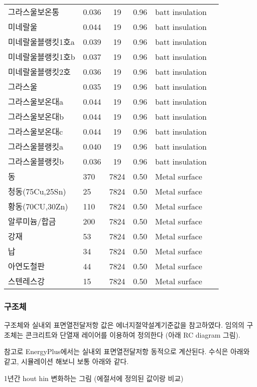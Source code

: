\begin{longtable}{llcclc}
  그라스울보온통 &   0.036 &   19 & 0.96 & batt insulation & \cite{ashrae_f18} \\
  미네랄울 &   0.044 &   19 & 0.96 & batt insulation & \cite{ashrae_f18} \\
  미네랄울블랭킷1호a &   0.039 &   19 & 0.96 & batt insulation & \cite{ashrae_f18} \\
  미네랄울블랭킷1호b &   0.037 &   19 & 0.96 & batt insulation & \cite{ashrae_f18} \\
  미네랄울블랭킷2호 &   0.036 &   19 & 0.96 & batt insulation & \cite{ashrae_f18} \\
  그라스울 &   0.035 &   19 & 0.96 & batt insulation & \cite{ashrae_f18} \\
  그라스울보온대a &   0.044 &   19 & 0.96 & batt insulation & \cite{ashrae_f18} \\
  그라스울보온대b &   0.044 &   19 & 0.96 & batt insulation & \cite{ashrae_f18} \\
  그라스울보온대c &   0.044 &   19 & 0.96 & batt insulation & \cite{ashrae_f18} \\
  그라스울블랭킷a &   0.040 &   19 & 0.96 & batt insulation & \cite{ashrae_f18} \\
  그라스울블랭킷b &   0.036 &   19 & 0.96 & batt insulation & \cite{ashrae_f18} \\
  동 & 370 & 7824 & 0.50 & Metal surface & \cite{ashrae_f18} \\
  청동(75Cu,25Sn) &  25 & 7824 & 0.50 & Metal surface & \cite{ashrae_f18} \\
  황동(70CU,30Zn) & 110 & 7824 & 0.50 & Metal surface & \cite{ashrae_f18} \\
  알루미늄/합금 & 200 & 7824 & 0.50 & Metal surface & \cite{ashrae_f18} \\
  강재 &  53 & 7824 & 0.50 & Metal surface & \cite{ashrae_f18} \\
  납 &  34 & 7824 & 0.50 & Metal surface & \cite{ashrae_f18} \\
  아연도철판 &  44 & 7824 & 0.50 & Metal surface & \cite{ashrae_f18} \\
  스텐레스강 &  15 & 7824 & 0.50 & Metal surface & \cite{ashrae_f18} \\
  \bottomrule
\end{longtable}

\subsubsection{구조체}
구조체와 실내외 표면열전달저항 값은 에너지절약설계기준값을 참고하였다. 임의의 구조체는 콘크리트와 단열재 레이어를 이용하여 정의한다 (아래 RC diagram 그림).\par
참고로 EnergyPlus에서는 실내외 표면열전달저항 동적으로 계산된다. 수식은 아래와 같고, 시뮬레이션 해보니 보통 아래와 같다. 
\begin{tcolorbox}[colback=gray!10, colframe=gray!80, boxrule=0.5pt, left=1em, right=1em]
1년간 hout hin 변화하는 그림 (에절서에 정의된 값이랑 비교)
\end{tcolorbox}

